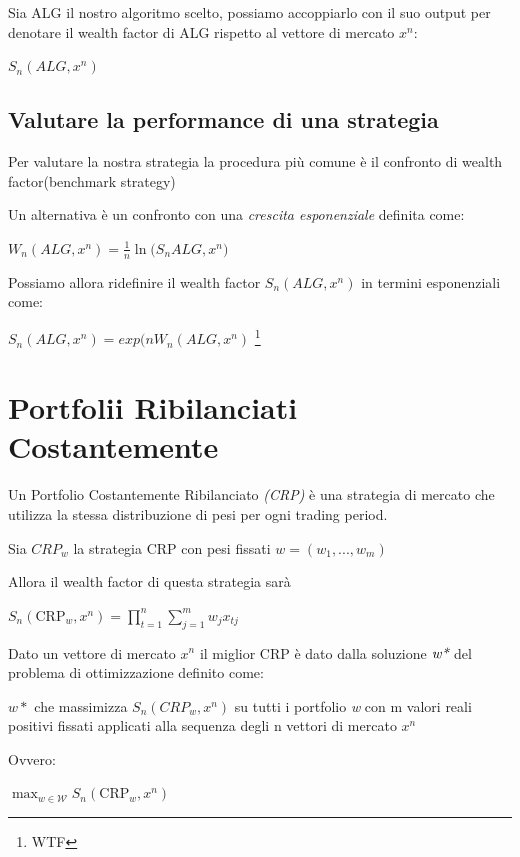 \documentclass[a4paper,11pt]{report}
\begin{document}
{	Sia ALG il nostro algoritmo scelto, possiamo accoppiarlo con il suo output per denotare il wealth factor di ALG rispetto al vettore di mercato $x^n$:
\begin{center}
	$S_n(ALG,x^n)$
\end{center}
\subsection{Valutare la performance di una strategia}
	Per valutare la nostra strategia la procedura più comune è il confronto di wealth factor(benchmark strategy)

	Un alternativa è un confronto con una  \emph{crescita esponenziale} definita come:
\begin{center}
	$W_n(ALG,x^n)= {\frac{1}{n}} {\ln{(S_n}{ALG,x^n)}}$
\end{center}

	Possiamo allora ridefinire il wealth factor $S_n(ALG,x^n)$ in termini esponenziali come:
\begin{center}
	 $S_n(ALG,x^n) = exp(nW_n(ALG,x^n)$ \footnote{WTF}
\end{center}
\section{Portfolii Ribilanciati Costantemente}
	Un Portfolio Costantemente Ribilanciato \emph{(CRP)} è una strategia di mercato che utilizza la stessa distribuzione di pesi per ogni trading period.
	
	Sia $CRP_w$ la strategia CRP con pesi fissati $w=(w_1,...,w_m)$
	
	Allora il wealth factor di questa strategia sarà
	
	\begin{center}$
	S _ { n } \left( \mathrm { CRP } _ { w } , x ^ { n } \right) = \prod _ { t = 1 } ^ { n } \sum _ { j = 1 } ^ { m } w _ { j } x _ { t j }$
\end{center}	 

Dato un vettore di mercato $x^n$ il miglior CRP è dato dalla soluzione $\emph{w*}$ del problema di ottimizzazione definito come:

$w*$ che massimizza $S_n(CRP_w,x^n)$ su tutti i portfolio \emph{w} con m valori reali positivi fissati applicati alla sequenza degli n vettori di mercato $x^n$

Ovvero:

\begin{center}$
\max _ { w \in \mathscr { W } } S _ { n } \left( \mathrm { CRP } _ { w } , x ^ { n } \right)$
\end{center}

}
\end{document}
